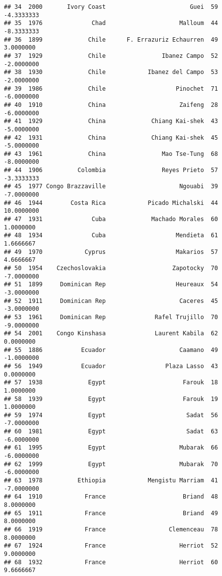 \documentclass[
]{article}
\begin{document}
\begin{verbatim}
## 34  2000       Ivory Coast                        Guei  59   -4.3333333
## 35  1976              Chad                     Malloum  44   -8.3333333
## 36  1899             Chile      F. Errazuriz Echaurren  49    3.0000000
## 37  1929             Chile                Ibanez Campo  52   -2.0000000
## 38  1930             Chile            Ibanez del Campo  53   -2.0000000
## 39  1986             Chile                    Pinochet  71   -6.0000000
## 40  1910             China                     Zaifeng  28   -6.0000000
## 41  1929             China             Chiang Kai-shek  43   -5.0000000
## 42  1931             China             Chiang Kai-shek  45   -5.0000000
## 43  1961             China                Mao Tse-Tung  68   -8.0000000
## 44  1906          Colombia                Reyes Prieto  57   -3.3333333
## 45  1977 Congo Brazzaville                     Ngouabi  39   -7.0000000
## 46  1944        Costa Rica            Picado Michalski  44   10.0000000
## 47  1931              Cuba             Machado Morales  60    1.0000000
## 48  1934              Cuba                    Mendieta  61    1.6666667
## 49  1970            Cyprus                    Makarios  57    4.6666667
## 50  1954    Czechoslovakia                   Zapotocky  70   -7.0000000
## 51  1899     Dominican Rep                    Heureaux  54   -3.0000000
## 52  1911     Dominican Rep                     Caceres  45   -3.0000000
## 53  1961     Dominican Rep              Rafel Trujillo  70   -9.0000000
## 54  2001    Congo Kinshasa              Laurent Kabila  62    0.0000000
## 55  1886           Ecuador                     Caamano  49   -1.0000000
## 56  1949           Ecuador                 Plaza Lasso  43    0.0000000
## 57  1938             Egypt                      Farouk  18    1.0000000
## 58  1939             Egypt                      Farouk  19    1.0000000
## 59  1974             Egypt                       Sadat  56   -7.0000000
## 60  1981             Egypt                       Sadat  63   -6.0000000
## 61  1995             Egypt                     Mubarak  66   -6.0000000
## 62  1999             Egypt                     Mubarak  70   -6.0000000
## 63  1978          Ethiopia            Mengistu Marriam  41   -7.0000000
## 64  1910            France                      Briand  48    8.0000000
## 65  1911            France                      Briand  49    8.0000000
## 66  1919            France                  Clemenceau  78    8.0000000
## 67  1924            France                     Herriot  52    9.0000000
## 68  1932            France                     Herriot  60    9.6666667

\end{verbatim}
\end{document}

